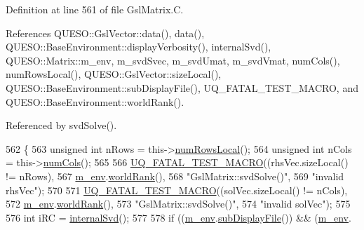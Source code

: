 Definition at line 561 of file Gsl\-Matrix.\-C.



References Q\-U\-E\-S\-O\-::\-Gsl\-Vector\-::data(), data(), Q\-U\-E\-S\-O\-::\-Base\-Environment\-::display\-Verbosity(), internal\-Svd(), Q\-U\-E\-S\-O\-::\-Matrix\-::m\-\_\-env, m\-\_\-svd\-Svec, m\-\_\-svd\-Umat, m\-\_\-svd\-Vmat, num\-Cols(), num\-Rows\-Local(), Q\-U\-E\-S\-O\-::\-Gsl\-Vector\-::size\-Local(), Q\-U\-E\-S\-O\-::\-Base\-Environment\-::sub\-Display\-File(), U\-Q\-\_\-\-F\-A\-T\-A\-L\-\_\-\-T\-E\-S\-T\-\_\-\-M\-A\-C\-R\-O, and Q\-U\-E\-S\-O\-::\-Base\-Environment\-::world\-Rank().



Referenced by svd\-Solve().


\begin{DoxyCode}
562 \{
563   \textcolor{keywordtype}{unsigned} \textcolor{keywordtype}{int} nRows = this->\hyperlink{class_q_u_e_s_o_1_1_gsl_matrix_ab5ec937a9fd439eef1a87e12c0dbccb4}{numRowsLocal}();
564   \textcolor{keywordtype}{unsigned} \textcolor{keywordtype}{int} nCols = this->\hyperlink{class_q_u_e_s_o_1_1_gsl_matrix_ad5005f168fe030468e834776afb1859b}{numCols}();
565 
566   \hyperlink{_defines_8h_a56d63d18d0a6d45757de47fcc06f574d}{UQ\_FATAL\_TEST\_MACRO}((rhsVec.sizeLocal() != nRows),
567                       \hyperlink{class_q_u_e_s_o_1_1_matrix_a247fb0fc0b87fecdee054bb4660b68e8}{m\_env}.\hyperlink{class_q_u_e_s_o_1_1_base_environment_a78b57112bbd0e6dd0e8afec00b40ffa7}{worldRank}(),
568                       \textcolor{stringliteral}{"GslMatrix::svdSolve()"},
569                       \textcolor{stringliteral}{"invalid rhsVec"});
570 
571   \hyperlink{_defines_8h_a56d63d18d0a6d45757de47fcc06f574d}{UQ\_FATAL\_TEST\_MACRO}((solVec.sizeLocal() != nCols),
572                       \hyperlink{class_q_u_e_s_o_1_1_matrix_a247fb0fc0b87fecdee054bb4660b68e8}{m\_env}.\hyperlink{class_q_u_e_s_o_1_1_base_environment_a78b57112bbd0e6dd0e8afec00b40ffa7}{worldRank}(),
573                       \textcolor{stringliteral}{"GslMatrix::svdSolve()"},
574                       \textcolor{stringliteral}{"invalid solVec"});
575 
576   \textcolor{keywordtype}{int} iRC = \hyperlink{class_q_u_e_s_o_1_1_gsl_matrix_a971c0fcee50b741419f4f2322329647f}{internalSvd}();
577 
578   \textcolor{keywordflow}{if} ((\hyperlink{class_q_u_e_s_o_1_1_matrix_a247fb0fc0b87fecdee054bb4660b68e8}{m\_env}.\hyperlink{class_q_u_e_s_o_1_1_base_environment_a8a0064746ae8dddfece4229b9ad374d6}{subDisplayFile}()) && (\hyperlink{class_q_u_e_s_o_1_1_matrix_a247fb0fc0b87fecdee054bb4660b68e8}{m\_env}.

\end{DoxyCode}
